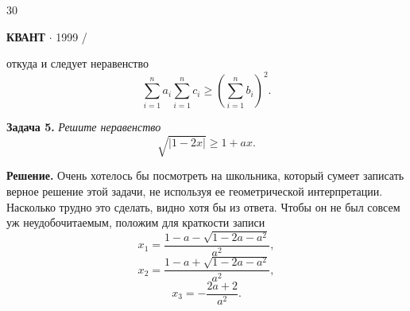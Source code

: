 {\begin{minipage}[b]{0.33333\textwidth}
\raggedright
{\large 30}
\end{minipage}%
\begin{minipage}[b]{0.33333\textwidth}
\centering
\textbf{КВАНТ} $\cdot$ \textsf{1999 \slash {}}
\end{minipage}%

\begin{multicols}{3}
откуда и следует неравенство \\
\[\sum_{i=1}^{n} a_i \sum_{i=1}^{n} c_i \geq (\sum_{i=1}^{n} b_i)^2.\] \par
\textbf{Задача 5.} \textsl{Решите неравенство}
\[\sqrt{|1 - 2x|} \geq 1 + ax.\] \par
\textbf{Решение.}  Очень хотелось бы посмотреть на школьника,
который сумеет записать верное решение этой задачи,
не используя ее геометрической интерпретации. Насколько
трудно это сделать, видно хотя бы из ответа. Чтобы он не
был совсем уж неудобочитаемым, положим для краткости записи\\
\[x_1 = \frac{1 - a - \sqrt{1 - 2a - a^2}}{a^2},\]
\[x_2 = \frac{1 - a + \sqrt{1 - 2a - a^2}}{a^2},\]
\[x_3 = -\frac{2a + 2}{a^2}.\]


\end{multicols}}
